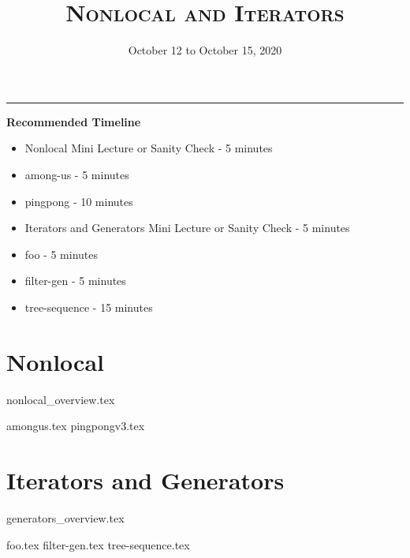 \documentclass{exam}
\title{\textsc{Nonlocal and Iterators}}
\date{October 12 to October 15, 2020}
\begin{document}
\maketitle
\rule{\textwidth}{0.15em}
\fontsize{12}{15}\selectfont

\begin{guide}
\textbf{Recommended Timeline}
\begin{itemize}
    \item Nonlocal Mini Lecture or Sanity Check - 5 minutes
    \item among-us - 5 minutes
    \item pingpong - 10 minutes
    \item Iterators and Generators Mini Lecture or Sanity Check - 5 minutes
    \item foo - 5 minutes
    \item filter-gen - 5 minutes
    \item tree-sequence - 15 minutes
\end{itemize}
\end{guide}

\section{Nonlocal}
{nonlocal_overview.tex}
\begin{questions}
{amongus.tex}
{pingpongv3.tex}
\end{questions}

\newpage
\section{Iterators and Generators}
{generators_overview.tex}
\begin{questions}
{foo.tex}
{filter-gen.tex}
{tree-sequence.tex}
\end{questions}
\end{document}
